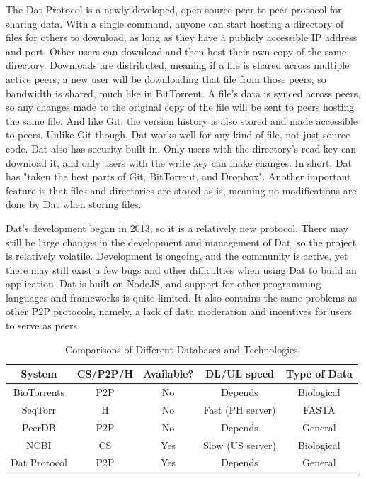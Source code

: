 \documentclass[acmsmall]{acmart}
\begin{document}
The Dat Protocol is a newly-developed, open source peer-to-peer protocol for sharing data\cite{dat}. With a single command, anyone can start hosting a directory of files for others to download, as long as they have a publicly accessible IP address and port. Other users can download and then host their own copy of the same directory. Downloads are distributed, meaning if a file is shared across multiple active peers, a new user will be downloading that file from those peers, so bandwidth is shared, much like in BitTorrent. A file's data is synced across peers, so any changes made to the original copy of the file will be sent to peers hosting the same file. And like Git, the version history is also stored and made accessible to peers. Unlike Git though, Dat works well for any kind of file, not just source code. Dat also has security built in. Only users with the directory's read key can download it, and only users with the write key can make changes. In short, Dat has "taken the best parts of Git, BitTorrent, and Dropbox". Another important feature is that files and directories are stored as-is, meaning no modifications are done by Dat when storing files.

Dat's development began in 2013, so it is a relatively new protocol. There may still be large changes in the development and management of Dat, so the project is relatively volatile. Development is ongoing, and the community is active, yet there may still exist a few bugs and other difficulties when using Dat to build an application. Dat is built on NodeJS, and support for other programming languages and frameworks is quite limited. It also contains the same problems as other P2P protocols, namely, a lack of data moderation and incentives for users to serve as peers.


\begin{table}[h]
    \caption{Comparisons of Different Databases and Technologies}
    \label{table:database_comparison_table}
    \begin{tabular}{ccccc}
    \toprule
    System      & CS/P2P/H & Available? & DL/UL speed & Type of Data \\ 
    \midrule
    BioTorrents & P2P           & No         & Depends                    & Biological  \\ 
    SeqTorr     & H             & No         & Fast (PH server)           & FASTA        \\ 
    PeerDB      & P2P           & No         & Depends                    & General      \\ 
    NCBI        & CS            & Yes        & Slow (US server)           & Biological  \\
    Dat Protocol    & P2P      & Yes        & Depends           & General  \\ 
    \bottomrule
    \end{tabular}
\end{table} 
\end{document}
